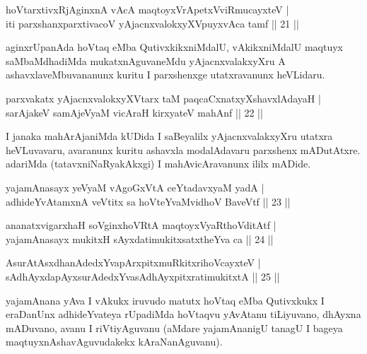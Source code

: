 
\begin{shl}
hoVtarxtivxRjA\s ginxnA vAcA maqtoyxVrApetxVviRmucayxteV |\\
iti parxshanxparxtivacoV yAjacnxvalokxyXV\s puyxvAca tamf \hfill || 21 ||
\end{shl}

\begin{artha}
aginxrUpanAda hoVtaq eMba QutivxkikxniMdalU, vAkikxniMdalU maqtuyx saMbaMdhadiMda mukatxnAguvaneMdu yAjacnxvalakxyXru A ashavxlaveMbuvananunx kuritu I parxshenxge utatxravanunx heVLidaru.
\end{artha}

\begin{shl}
parxvakatx yAjacnxvalokxyXV\s tarx taM paqcaCxnatxyXshavxlAdayaH |\\
sarAjakeV samAjeV\s yaM vicAraH kirxyateV mahAnf \hfill || 22 ||
\end{shl}

\begin{artha}
I janaka mahArAjaniMda kUDida I saBeyalilx yAjacnxvalakxyXru utatxra heVLuvavaru, avaranunx kuritu ashavxla modalAdavaru parxshenx mADutAtxre. adariMda (tatavxniNaRyakAkxgi) I mahAvicAravanunx ililx mADide.
\end{artha}


\begin{shl}
yajamAnasayx yeVyaM vAgoGxVtA ceYtadavxyaM yadA |\\
adhideYvAtamxnA veVtitx sa hoVteYvaMvidhoV BaveVtf \hfill || 23 ||
\end{shl}

\begin{shl}
ananatxvigarxhaH soV\s ginxhoVRtA maqtoyxVyaRthoVditAtf |\\
yajamAnasayx mukitxH sAyxdatimukitxsatxtheYva ca \hfill || 24 ||
\end{shl}

\begin{shl}
AsurAtAsxdhanAdedxYvapArxpitxmuRkitxrihoVcayxteV |\\
sAdhAyxdapAyxsurAdedxYvasAdhAyxpitxratimukitxtA \hfill || 25 ||
\end{shl}

\begin{artha}
yajamAnana yAva I vAkukx iruvudo matutx hoVtaq eMba Qutivxkukx I eraDanUnx adhideYvateya rUpadiMda hoVtaqvu yAvAtanu tiLiyuvano, dhAyxna mADuvano, avanu I riVtiyAguvanu (aMdare yajamAnanigU tanagU I bageya maqtuyxnAshavAguvudakekx kAraNanAguvanu).
\end{artha}

